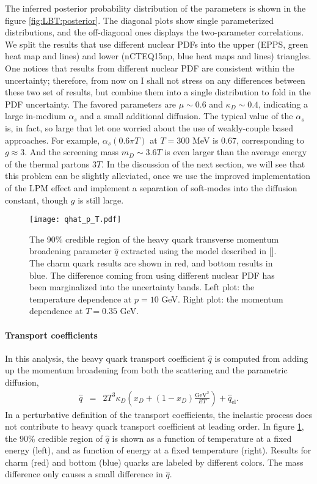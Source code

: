 The inferred posterior probability distribution of the parameters is shown in the figure \ref{fig:LBT:posterior}.
The diagonal plots show single parameterized distributions, and the off-diagonal ones displays the two-parameter correlations.
We split the results that use different nuclear PDFs into the upper (EPPS, green heat map and lines) and lower (nCTEQ15np, blue heat maps and lines) triangles.
One notices that results from different nuclear PDF are consistent within the uncertainty; therefore, from now on I shall not stress on any differences between these two set of results, but combine them into a single distribution to fold in the PDF uncertainty.
The favored parameters are $\mu \sim 0.6$ and $\kappa_D \sim 0.4$, indicating a large in-medium $\alpha_s$ and a small additional diffusion.
The typical value of the $\alpha_s$ is, in fact, so large that let one worried about the use of weakly-couple based approaches.
For example, $\alpha_s(0.6\pi T)$ at $T=300$ MeV is 0.67, corresponding to $g \approx 3$. 
And the screening mass $m_D \sim 3.6 T$ is even larger than the average energy of the thermal partons $3T$. 
In the discussion of the next section, we will see that this problem can be slightly alleviated, once we use the improved implementation of the LPM effect and implement a separation of soft-modes into the diffusion constant, though $g$ is still large.

\begin{figure}
\texttt{[image: qhat\_p\_T.pdf]}
\caption{The 90\% credible region of the heavy quark transverse momentum broadening parameter $\hat{q}$ extracted using the model described in [].
The charm quark results are shown in red, and bottom results in blue.
The difference coming from using different nuclear PDF has been marginalized into the uncertainty bands.
Left plot: the temperature dependence at $p=10$ GeV. Right plot: the momentum dependence at $T=0.35$ GeV.
}\label{fig:LBT:posterior_qhat}
\end{figure}

\paragraph{Transport coefficients} In this analysis, the heavy quark transport coefficient $\hat{q}$ is computed from adding up the momentum broadening from both the scattering and the parametric diffusion,
\begin{eqnarray}\label{eq:qhat}
\hat{q} &=& 2T^3\kappa_D\left(x_D + (1-x_D)\frac{\textrm{GeV}^2}{ET}\right) + \hat{q}_{\textrm{el}}.
\end{eqnarray}
In a perturbative definition of the transport coefficients, the inelastic process does not contribute to heavy quark transport coefficient at leading order. 
In figure \ref{fig:LBT:posterior_qhat}, the 90\% credible region of $\hat{q}$ is shown as a function of temperature at a fixed energy (left), and as function of energy at a fixed temperature (right).
Results for charm (red) and bottom (blue) quarks are labeled by different colors.
The mass difference only causes a small difference in $\hat{q}$.

